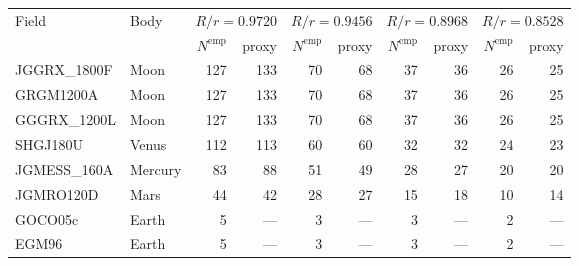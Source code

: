 \begin{tabular}{@{}l l r r r r r r r r @{}}
\toprule
Field & Body & \multicolumn{2}{c}{$R/r=0.9720$} & \multicolumn{2}{c}{$R/r=0.9456$} & \multicolumn{2}{c}{$R/r=0.8968$} & \multicolumn{2}{c}{$R/r=0.8528$}\\
& & $N^{\mathrm{emp}}$ & proxy & $N^{\mathrm{emp}}$ & proxy & $N^{\mathrm{emp}}$ & proxy & $N^{\mathrm{emp}}$ & proxy\\
\midrule
JGGRX\_1800F & Moon & 127 & 133 & 70 & 68 & 37 & 36 & 26 & 25\\
GRGM1200A & Moon & 127 & 133 & 70 & 68 & 37 & 36 & 26 & 25\\
GGGRX\_1200L & Moon & 127 & 133 & 70 & 68 & 37 & 36 & 26 & 25\\
SHGJ180U & Venus & 112 & 113 & 60 & 60 & 32 & 32 & 24 & 23\\
JGMESS\_160A & Mercury & 83 & 88 & 51 & 49 & 28 & 27 & 20 & 20\\
JGMRO120D & Mars & 44 & 42 & 28 & 27 & 15 & 18 & 10 & 14\\
GOCO05c & Earth & 5 & --- & 3 & --- & 3 & --- & 2 & ---\\
EGM96 & Earth & 5 & --- & 3 & --- & 3 & --- & 2 & ---\\
\bottomrule
\end{tabular}
